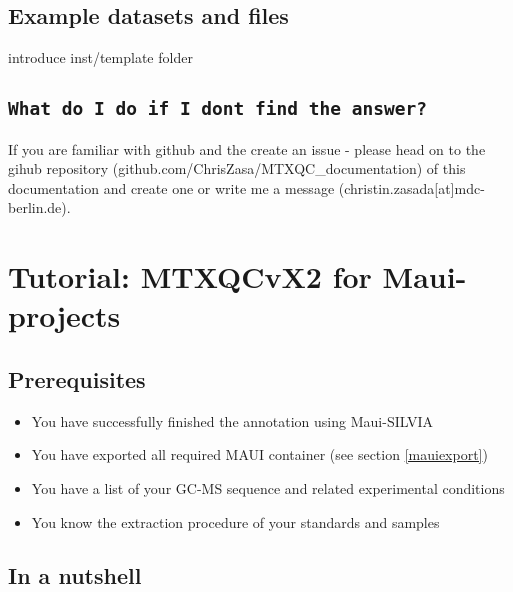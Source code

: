 \documentclass[]{book}
\providecommand{\tightlist}{%
  \setlength{\itemsep}{0pt}\setlength{\parskip}{0pt}}
\begin{document}
\hypertarget{example-datasets-and-files}{%
\section{Example datasets and files}\label{example-datasets-and-files}}

introduce inst/template folder

\hypertarget{what-do-i-do-if-i-dont-find-the-answer}{%
\section{\texorpdfstring{\texttt{What\ do\ I\ do\ if\ I\ don\textquotesingle{}t\ find\ the\ answer?}}{What do I do if I don't find the answer?}}\label{what-do-i-do-if-i-dont-find-the-answer}}

If you are familiar with github and the create an issue - please head on to the gihub repository (github.com/ChrisZasa/MTXQC\_documentation) of this documentation and create one or write me a message (christin.zasada{[}at{]}mdc-berlin.de).

\hypertarget{maui}{%
\chapter{Tutorial: MTXQCvX2 for Maui-projects}\label{maui}}

\hypertarget{prerequisites}{%
\section{Prerequisites}\label{prerequisites}}

\begin{itemize}
\tightlist
\item
  You have successfully finished the annotation using Maui-SILVIA
\item
  You have exported all required MAUI container (see section \ref{mauiexport})
\item
  You have a list of your GC-MS sequence and related experimental conditions
\item
  You know the extraction procedure of your standards and samples
\end{itemize}

\hypertarget{nutshellmaui}{%
\section{In a nutshell}\label{nutshellmaui}}
\end{document}
